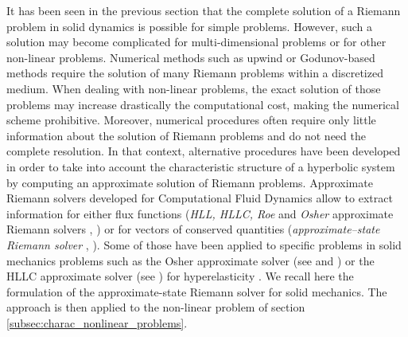 It has been seen in the previous section that the complete solution of a Riemann problem in solid dynamics is possible for simple problems. However, such a solution may become complicated for multi-dimensional problems or for other non-linear problems. 
Numerical methods such as upwind or Godunov-based methods \cite{Leveque} require the solution of many Riemann problems within a discretized medium. When dealing with non-linear problems, the exact solution of those problems may increase drastically the computational cost, making the numerical scheme prohibitive. Moreover, numerical procedures often require only little information about the solution of Riemann problems and do not need the complete resolution. In that context, alternative procedures have been developed in order to take into account the characteristic structure of a hyperbolic system by computing an approximate solution of Riemann problems. Approximate Riemann solvers developed for Computational Fluid Dynamics allow to extract information for either flux functions (\textit{HLL, HLLC, Roe} and \textit{Osher} approximate Riemann solvers \cite{Trangenstein}, \cite{Toro}) or for vectors of conserved quantities (\textit{approximate--state Riemann solver} \cite[Ch.9]{Toro}, \cite[Ch.22]{Leveque}). Some of those have been applied to specific problems in solid mechanics problems such as the Osher approximate solver (see \cite{LEE_FVM} and \cite{Haider_FVM}) or the HLLC approximate solver (see \cite{Ortega_HLLD}) for hyperelasticity . We recall here the formulation of the approximate-state Riemann solver for solid mechanics. The approach is then applied to the non-linear problem of section \ref{subsec:charac_nonlinear_problems}.

